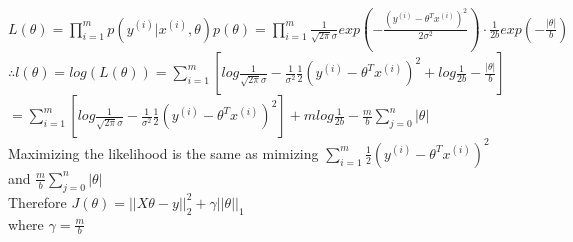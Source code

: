 \begin{answer}\\
$L(\theta)=\prod_{i=1}^{m}p(y^{(i)}|x^{(i)},\theta)p(\theta)=\prod_{i=1}^{m}\frac{1}{\sqrt{2 \pi}\sigma}exp(-\frac{(y^{(i)}-\theta^T x^{(i)})^2}{2 \sigma^2}) \cdot \frac{1}{2b}exp(-\frac{|\theta|}{b})$\\
$\therefore l(\theta)=log(L(\theta))=\sum_{i=1}^{m}\left [ log \frac{1}{\sqrt{2 \pi} \sigma}-\frac{1}{\sigma^2}\frac{1}{2}(y^{(i)}-\theta^T x^{(i)})^2 + log \frac{1}{2b} -\frac{|\theta|}{b} \right]$\\
$=\sum_{i=1}^{m}\left [ log \frac{1}{\sqrt{2 \pi} \sigma}-\frac{1}{\sigma^2}\frac{1}{2}(y^{(i)}-\theta^T x^{(i)})^2 \right ] + m log \frac{1}{2b} - \frac{m}{b}\sum_{j=0}^{n}|\theta|$\\
Maximizing the likelihood is the same as mimizing $\sum_{i=1}^{m}\frac{1}{2}(y^{(i)}-\theta^T x^{(i)})^2$ and $\frac{m}{b}\sum_{j=0}^{n}|\theta|$\\
Therefore $J(\theta)=||X\theta-y||_2^2+\gamma||\theta||_1$\\
where $\gamma=\frac{m}{b}$\\
\end{answer}
